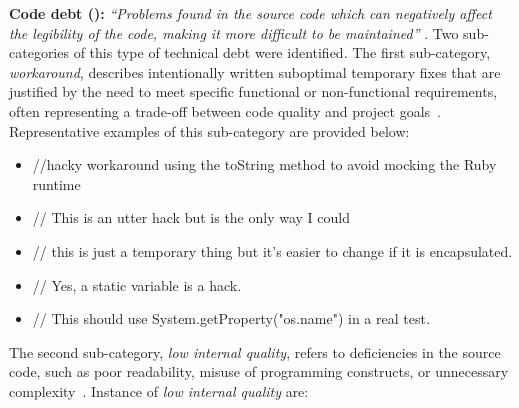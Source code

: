 \textbf{Code debt (\codeCount{}):} \textit{``Problems found in the source code which can negatively affect the legibility of the code, making it more difficult to be maintained''} \cite{alves_towards_2014}. Two sub-categories of this type of technical debt were identified. The first sub-category, \textit{workaround}, describes intentionally written suboptimal temporary fixes that are justified by the need to meet specific functional or non-functional requirements, often representing a trade-off between code quality and project goals~\cite{bavota_large-scale_2016}. Representative examples of this sub-category are provided below:
\begin{itemize}[itemsep=-2pt]
    \item \textcolor{commentColor}{//hacky workaround using the toString method to avoid mocking the Ruby runtime}
    \item \textcolor{commentColor}{// This is an utter hack but is the only way I could}
    \item \textcolor{commentColor}{// this is just a temporary thing but it's easier to change if it is encapsulated.}
    \item \textcolor{commentColor}{// Yes, a static variable is a hack.}
    \item \textcolor{commentColor}{// This should use System.getProperty("os.name") in a real test.}
\end{itemize}


The second sub-category, \textit{low internal quality}, refers to deficiencies in the source code, such as poor readability, misuse of programming constructs, or unnecessary complexity~\cite{bavota_large-scale_2016}. Instance of \textit{low internal quality} are:

